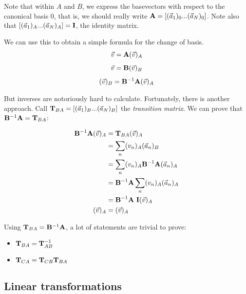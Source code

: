 Note that within $A$ and $B$, we express the basevectors with respect to the canonical basis $0$, that is, we should really write $\mathbf{A} = [(\vec{a}_1)_0  ...  (\vec{a}_N)_0]$. Note also that $[(\vec{a}_1)_A  ...  (\vec{a}_N)_A] = \mathbf{I}$, the identity matrix. 

We can use this to obtain a simple formula for the change of basis. 
$$ \vec{v} = \mathbf{A} (\vec{v})_A $$
$$ \vec{v} = \mathbf{B} (\vec{v})_B $$
$$ (\vec{v})_B = \mathbf{B}^{-1} \mathbf{A} (\vec{v})_A $$

But inverses are notoriously hard to calculate. Fortunately, there is another approach. Call $\mathbf{T}_{BA} = [(\vec{a}_1)_B ... (\vec{a}_N)_B]$ the \emph{transition matrix}. We can prove that $\mathbf{B}^{-1} \mathbf{A} = \mathbf{T}_{BA}$:

\begin{equation}
\begin{aligned}
\mathbf{B}^{-1} \mathbf{A} (\vec{v})_A &= \mathbf{T}_{BA}  (\vec{v})_A \\
                                   &= \sum_n (v_n)_A (\vec{a}_n)_B \\
                                   &= \sum_n (v_n)_A \mathbf{B}^{-1} \mathbf{A} (\vec{a}_n)_A \\
                                   &= \mathbf{B}^{-1} \mathbf{A} \sum_n (v_n)_A (\vec{a}_n)_A \\
                                   &= \mathbf{B}^{-1} \mathbf{A} \text{  } \mathbf{I} (\vec{v})_A \\
                    (\vec{v})_A &=  (\vec{v})_A         
\end{aligned}
\end{equation}

Using $\mathbf{T}_{BA} = \mathbf{B}^{-1}\mathbf{A}$, a lot of statements are trivial to prove:
\begin{itemize}
    \item $\mathbf{T}_{BA} = \mathbf{T}_{AB}^{-1}$
    \item $\mathbf{T}_{CA} = \mathbf{T}_{CB} \mathbf{T}_{BA}$
\end{itemize}













\subsection{Linear transformations}

